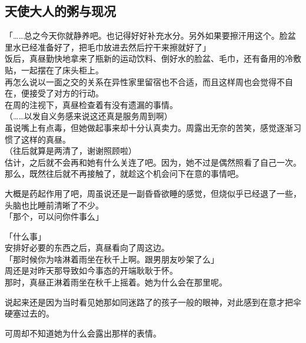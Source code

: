 \subsection{天使大人的粥与现况}

「……总之今天你就静养吧。也记得好好补充水分。另外如果要擦汗用这个。脸盆里水已经准备好了，把毛巾放进去然后拧干来擦就好了」\\

饭后，真昼勤快地拿来了瓶新的运动饮料、倒好水的脸盆、毛巾，还有备用的冷敷贴，一起摆在了床头柜上。\\

再怎么说以一面之交的关系在异性家里留宿也不合适，而且这样周也会觉得不自在，便接受了对方的行动。\\

在周的注视下，真昼检查着有没有遗漏的事情。\\

（……以发自义务感来说这还真是服务周到啊）\\

虽说嘴上有点毒，但她做起事来却十分认真卖力。周露出无奈的苦笑，感觉逐渐习惯了这样的真昼。\\

（往后就算是两清了，谢谢照顾啦）\\

估计，之后就不会再和她有什么关连了吧。因为，她不过是偶然照看了自己一次。\\

那么，既然往后就不再接触了，就趁这个机会问下在意的事情吧。

大概是药起作用了吧，周虽说还是一副昏昏欲睡的感觉，但烧似乎已经退了一些，头脑也比睡前清晰了不少。\\

「那个，可以问你件事么」

「什么事」\\

安排好必要的东西之后，真昼看向了周这边。\\

「那时候你为啥淋着雨坐在秋千上啊。跟男朋友吵架了么」\\

周还是对昨天那导致如今事态的开端耿耿于怀。\\

那时，真昼正淋着雨坐在秋千上摇着。她为什么会在那里呢。

说起来还是因为当时看见她那如同迷路了的孩子一般的眼神，对此感到在意才把伞硬塞过去的。

可周却不知道她为什么会露出那样的表情。\\

